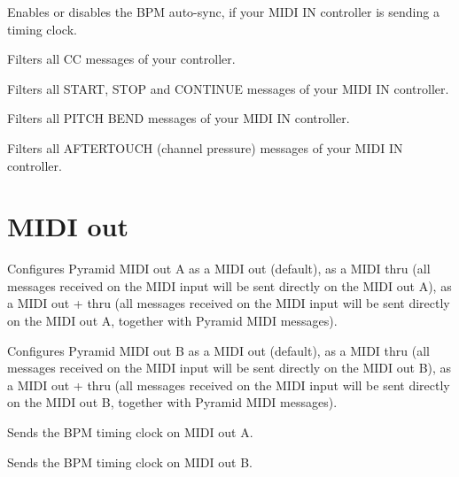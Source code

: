   

Enables or disables the BPM auto-sync, if your MIDI IN controller is sending a timing clock.

  

Filters all CC messages of your controller.

  

Filters all START, STOP and CONTINUE messages of your MIDI IN controller.

  

Filters all PITCH BEND messages of your MIDI IN controller.

  

Filters all AFTERTOUCH (channel pressure) messages of your MIDI IN controller.


\section{MIDI out}

   

Configures Pyramid MIDI out A as a MIDI out (default), as a MIDI thru (all messages received on the MIDI input will be sent directly on the MIDI out A), as a MIDI out + thru (all messages received on the MIDI input will be sent directly on the MIDI out A, together with Pyramid MIDI messages).

   

Configures Pyramid MIDI out B as a MIDI out (default), as a MIDI thru (all messages received on the MIDI input will be sent directly on the MIDI out B), as a MIDI out + thru (all messages received on the MIDI input will be sent directly on the MIDI out B, together with Pyramid MIDI messages).

  

Sends the BPM timing clock on MIDI out A.

  

Sends the BPM timing clock on MIDI out B.

